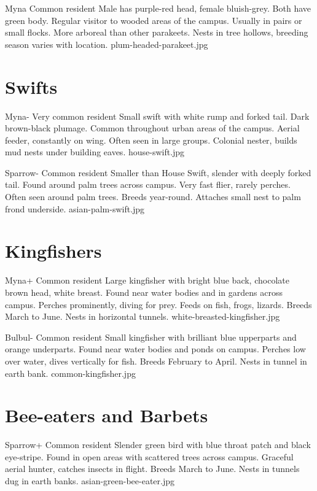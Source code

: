 \documentclass[aspectratio=169]{beamer}
\begin{document}
{Myna}
{Common resident}
{Male has purple-red head, female bluish-grey. Both have green body.}
{Regular visitor to wooded areas of the campus.}
{Usually in pairs or small flocks. More arboreal than other parakeets.}
{Nests in tree hollows, breeding season varies with location.}
{plum-headed-parakeet.jpg}

\section{Swifts}
{Myna-}
{Very common resident}
{Small swift with white rump and forked tail. Dark brown-black plumage.}
{Common throughout urban areas of the campus.}
{Aerial feeder, constantly on wing. Often seen in large groups.}
{Colonial nester, builds mud nests under building eaves.}
{house-swift.jpg}

{Sparrow-}
{Common resident}
{Smaller than House Swift, slender with deeply forked tail.}
{Found around palm trees across campus.}
{Very fast flier, rarely perches. Often seen around palm trees.}
{Breeds year-round. Attaches small nest to palm frond underside.}
{asian-palm-swift.jpg}

\section{Kingfishers}
{Myna+}
{Common resident}
{Large kingfisher with bright blue back, chocolate brown head, white breast.}
{Found near water bodies and in gardens across campus.}
{Perches prominently, diving for prey. Feeds on fish, frogs, lizards.}
{Breeds March to June. Nests in horizontal tunnels.}
{white-breasted-kingfisher.jpg}

{Bulbul-}
{Common resident}
{Small kingfisher with brilliant blue upperparts and orange underparts.}
{Found near water bodies and ponds on campus.}
{Perches low over water, dives vertically for fish.}
{Breeds February to April. Nests in tunnel in earth bank.}
{common-kingfisher.jpg}

\section{Bee-eaters and Barbets}
{Sparrow+}
{Common resident}
{Slender green bird with blue throat patch and black eye-stripe.}
{Found in open areas with scattered trees across campus.}
{Graceful aerial hunter, catches insects in flight.}
{Breeds March to June. Nests in tunnels dug in earth banks.}
{asian-green-bee-eater.jpg}
\end{document}
